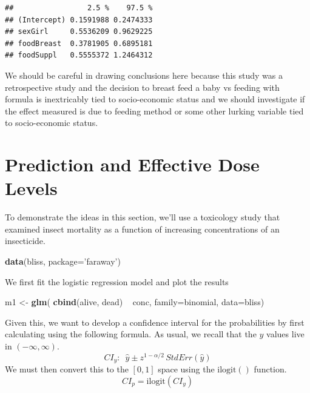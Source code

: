 \documentclass[]{book}
\newenvironment{Shaded}{\begin{snugshade}}{\end{snugshade}}
\newcommand{\KeywordTok}[1]{\textcolor[rgb]{0.13,0.29,0.53}{\textbf{{#1}}}}
\newcommand{\DataTypeTok}[1]{\textcolor[rgb]{0.13,0.29,0.53}{{#1}}}
\newcommand{\StringTok}[1]{\textcolor[rgb]{0.31,0.60,0.02}{{#1}}}
\newcommand{\NormalTok}[1]{{#1}}
\theoremstyle{definition}
\theoremstyle{definition}
\theoremstyle{remark}
\begin{document}
\begin{verbatim}
##                 2.5 %    97.5 %
## (Intercept) 0.1591988 0.2474333
## sexGirl     0.5536209 0.9629225
## foodBreast  0.3781905 0.6895181
## foodSuppl   0.5555372 1.2464312
\end{verbatim}

We should be careful in drawing conclusions here because this study was
a retrospective study and the decision to breast feed a baby vs feeding
with formula is inextricably tied to socio-economic status and we should
investigate if the effect measured is due to feeding method or some
other lurking variable tied to socio-economic status.

\section{Prediction and Effective Dose
Levels}\label{prediction-and-effective-dose-levels}

To demonstrate the ideas in this section, we'll use a toxicology study
that examined insect mortality as a function of increasing
concentrations of an insecticide.

\begin{Shaded}
\begin{Highlighting}[]
\KeywordTok{data}\NormalTok{(bliss, }\DataTypeTok{package=}\StringTok{'faraway'}\NormalTok{)}
\end{Highlighting}
\end{Shaded}

We first fit the logistic regression model and plot the results

\begin{Shaded}
\begin{Highlighting}[]
\NormalTok{m1 <-}\StringTok{ }\KeywordTok{glm}\NormalTok{( }\KeywordTok{cbind}\NormalTok{(alive, dead) ~}\StringTok{ }\NormalTok{conc, }\DataTypeTok{family=}\NormalTok{binomial, }\DataTypeTok{data=}\NormalTok{bliss)}
\end{Highlighting}
\end{Shaded}

Given this, we want to develop a confidence interval for the
probabilities by first calculating using the following formula. As
usual, we recall that the \(y\) values live in
\(\left(-\infty,\infty\right)\).
\[CI_{y}:\,\,\,\hat{y}\pm z^{1-\alpha/2}\,StdErr\left(\hat{y}\right)\]
We must then convert this to the \(\left[ 0,1 \right]\) space using the
\(\textrm{ilogit}()\) function.
\[CI_{p}=\textrm{ilogit}\left(CI_{y}\right)\]
\end{document}
